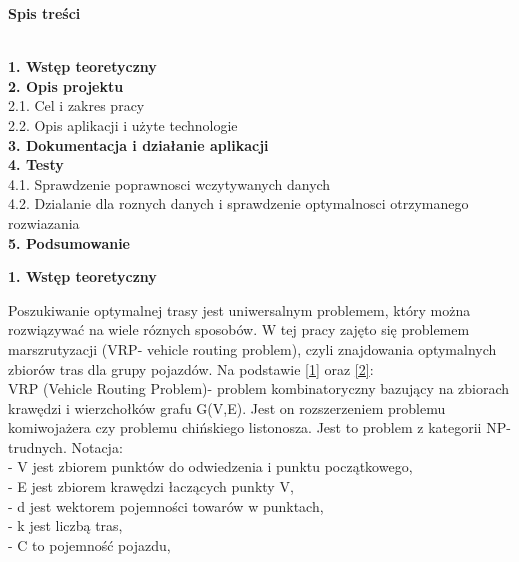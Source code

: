\documentclass[a4paper, twoside, 12pt, justified]{article}
\begin{document}
	\begin{flushleft}
		\begin{large}\textbf{Spis treści}\end{large}
		\textbf{
			\\1. Wstęp teoretyczny}\\
			\textbf{2. Opis projektu}\\
			\hspace{5mm}2.1. Cel i zakres pracy\\
			\hspace{5mm}2.2. Opis aplikacji i użyte technologie\\
			\textbf{3. Dokumentacja i działanie aplikacji}\\
			\textbf{4. Testy}\\
			\hspace{5mm}4.1. Sprawdzenie poprawnosci wczytywanych danych\\
			\hspace{5mm}4.2. Dzialanie dla roznych danych i sprawdzenie optymalnosci otrzymanego rozwiazania\\
			\textbf{5. Podsumowanie}\\
		
	\end{flushleft}
	\newpage
	
		
	\begin{large}\textbf{1. Wstęp teoretyczny}\end{large}
	\vspace{10mm} %
	
	Poszukiwanie optymalnej trasy jest uniwersalnym problemem, który można rozwiązywać na wiele róznych sposobów. W tej pracy zajęto się problemem marszrutyzacji (VRP- vehicle routing problem), czyli znajdowania optymalnych zbiorów tras dla grupy pojazdów. Na podstawie \hyperlink{vrp}{[1]} oraz \hyperlink{cvrp}{[2]}:\\
	VRP (Vehicle Routing Problem)- problem kombinatoryczny bazujący na zbiorach krawędzi i wierzchołków grafu G(V,E). Jest on rozszerzeniem problemu komiwojażera czy problemu chińskiego listonosza. Jest to problem z kategorii NP- trudnych. Notacja: \\
	- V jest zbiorem punktów do odwiedzenia i punktu początkowego,\\
	- E jest zbiorem krawędzi łaczących punkty V,\\
	- d jest wektorem pojemności towarów w punktach,\\
	- k jest liczbą tras,\\
	- C to pojemność pojazdu,\\
	
\end{document}
